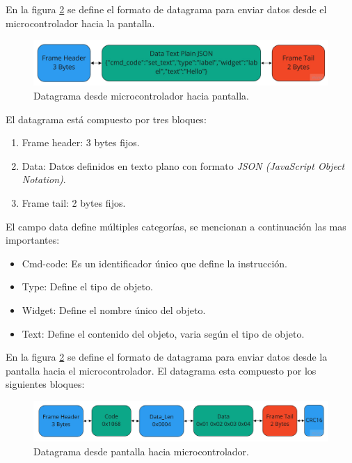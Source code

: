 En la figura \ref{fig:datagrama_a} se define el formato de datagrama para enviar datos desde el microcontrolador hacia la pantalla. 

\begin{figure}[h!]
	\centering
	\includegraphics[width=1\textwidth]{./Figures/datagrama_b.jpg}
	\caption{Datagrama desde microcontrolador hacia pantalla.}
	\label{fig:datagrama_b}
\end{figure}

El datagrama está compuesto por tres bloques:
\begin{enumerate}
\item Frame header: 3 bytes fijos.
\item Data: Datos definidos en texto plano con formato \textit{JSON (JavaScript Object Notation)}.
\item Frame tail: 2 bytes fijos.
\end{enumerate}

El campo data define múltiples categorías, se mencionan a continuación las mas importantes:
\begin{itemize}
\item Cmd-code: Es un identificador único que define la instrucción.
\item Type: Define el tipo de objeto.
\item Widget: Define el nombre único del objeto.
\item Text: Define el contenido del objeto, varia según el tipo de objeto.
\end{itemize}  

En la figura \ref{fig:datagrama_a} se define el formato de datagrama para enviar datos desde la pantalla hacia el microcontrolador. El datagrama esta compuesto por los siguientes bloques:

\begin{figure}[h!]
	\centering
	\includegraphics[width=1\textwidth]{./Figures/datagrama_a.jpg}
	\caption{Datagrama desde pantalla hacia microcontrolador.}
	\label{fig:datagrama_a}
\end{figure}

